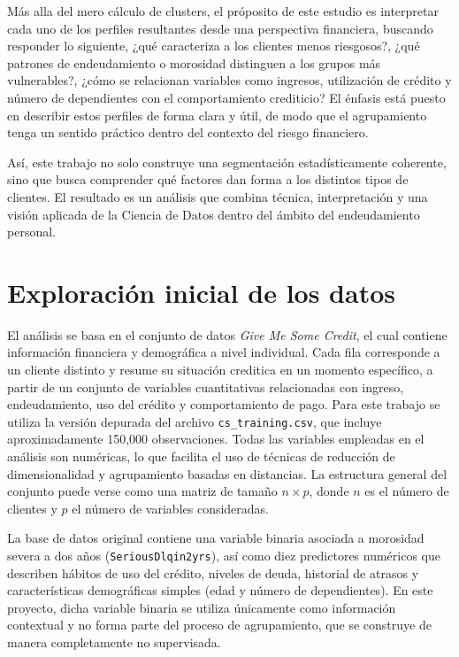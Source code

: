 \documentclass[a4paper,12pt]{article}
\begin{document}
Más alla del mero cálculo de clusters, el próposito de este estudio es interpretar cada uno de los perfiles resultantes desde una 
perspectiva financiera, buscando responder lo siguiente, ¿qué caracteriza a los clientes menos riesgosos?, ¿qué patrones de 
endeudamiento o morosidad distinguen a los grupos más vulnerables?, ¿cómo se relacionan variables como ingresos, utilización de 
crédito y número de dependientes con el comportamiento crediticio? El énfasis está puesto en describir estos perfiles de forma 
clara y útil, de modo que el agrupamiento tenga un sentido práctico dentro del contexto del riesgo financiero. 

Así, este trabajo no solo construye una segmentación estadísticamente coherente, sino que busca comprender qué factores dan 
forma a los distintos tipos de clientes. El resultado es un análisis que combina técnica, interpretación y una visión aplicada 
de la Ciencia de Datos dentro del ámbito del endeudamiento personal. 

\section{Exploración inicial de los datos}
El análisis se basa en el conjunto de datos \textit{Give Me Some Credit}, el cual contiene información financiera y demográfica 
a nivel individual. Cada fila corresponde a un cliente distinto y resume su situación creditica en un momento específico, a 
partir de un conjunto de variables cuantitativas relacionadas con ingreso, endeudamiento, uso del crédito y comportamiento 
de pago. Para este trabajo se utiliza la versión depurada del archivo \texttt{cs\_training.csv}, que incluye aproximadamente 
150,000 observaciones. Todas las variables empleadas en el análisis son numéricas, lo que facilita el uso de técnicas de reducción 
de dimensionalidad y agrupamiento basadas en distancias. La estructura general del conjunto puede verse como una matriz de tamaño 
$n \times p$, donde $n$ es el número de clientes y $p$ el número de variables consideradas. 

La base de datos original contiene una variable binaria asociada a morosidad severa a dos años (\texttt{SeriousDlqin2yrs}), así 
como diez predictores numéricos que describen hábitos de uso del crédito, niveles de deuda, historial de atrasos y características
demográficas simples (edad y número de dependientes). En este proyecto, dicha variable binaria se utiliza únicamente como información
contextual y no forma parte del proceso de agrupamiento, que se construye de manera completamente no supervisada. 
\end{document}
